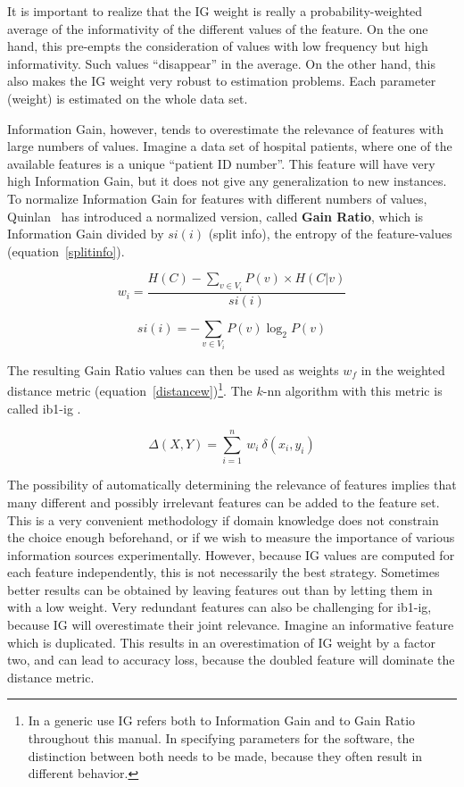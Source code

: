 \documentclass{report}
\begin{document}
It is important to realize that the IG weight is really a
probability-weighted average of the informativity of the different
values of the feature. On the one hand, this pre-empts the
consideration of values with low frequency but high
informativity. Such values ``disappear'' in the average. On the other
hand, this also makes the IG weight very robust to estimation
problems. Each parameter (weight) is estimated on the whole data set.

Information Gain, however, tends to overestimate the relevance of
features with large numbers of values. Imagine a data set of hospital
patients, where one of the available features is a unique ``patient ID
number''. This feature will have very high Information Gain, but it
does not give any generalization to new instances. To normalize
Information Gain for features with different numbers of values,
Quinlan~\cite{Quinlan93} has introduced a normalized version, called
{\bf Gain Ratio}, which is Information Gain divided by $si(i)$ (split info),
the entropy of the feature-values (equation~\ref{splitinfo}).

\begin{equation}
w_{i} = \frac{H(C) -  \sum_{v \in V_{i}} P(v) \times H(C|v)}{si(i)}
\label{IGgainratio}
\end{equation}

\begin{equation}
si(i) = - \sum_{v \in V_{i}} P(v) \log_{2} P(v)
\label{splitinfo}
\end{equation}

The resulting Gain Ratio values can then be used as weights $w_{f}$ in
the weighted distance metric (equation~\ref{distancew})\footnote{In a
generic use IG refers both to Information Gain and to Gain Ratio
throughout this manual. In specifying parameters for the software, the
distinction between both needs to be made, because they often result
in different behavior.}. The $k$-{\sc nn} algorithm with this
metric is called {\sc ib1-ig} \cite{Daelemans+92b}.

\begin{equation}
\Delta(X,Y) = \sum_{i=1}^{n}\ w_{i} \ \delta(x_{i},y_{i})
\label{distancew}
\end{equation} 

The possibility of automatically determining the relevance of features
implies that many different and possibly irrelevant features can be
added to the feature set. This is a very convenient methodology if
domain knowledge does not constrain the choice enough beforehand, or
if we wish to measure the importance of various information sources
experimentally. However, because IG values are computed for each
feature independently, this is not necessarily the best
strategy. Sometimes better results can be obtained by leaving features
out than by letting them in with a low weight. Very redundant features
can also be challenging for {\sc ib1-ig}, because IG will overestimate
their joint relevance. Imagine an informative feature which is
duplicated. This results in an overestimation of IG weight by a factor
two, and can lead to accuracy loss, because the doubled feature will
dominate the distance metric.
\end{document}
